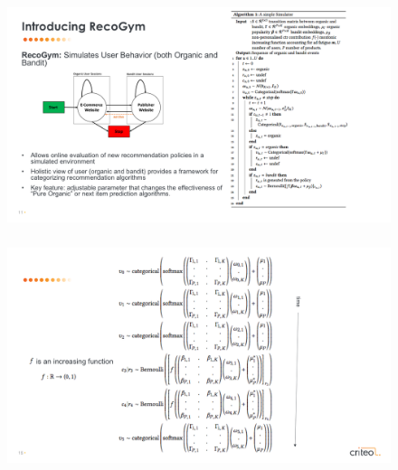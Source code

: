  \begin{frame}
  \frametitle{}
 
 
   \begin{figure}[h!]
     \includegraphics[scale=0.34]{images/recogym1}
       \centering
       \label{motex1}
   \end{figure}
     
 \end{frame}





 \begin{frame}
  \frametitle{}
 
 
   \begin{figure}[h!]
     \includegraphics[scale=0.3]{images/recogymsim}
       \centering
       \label{motex1}
   \end{figure}
     
 \end{frame}



